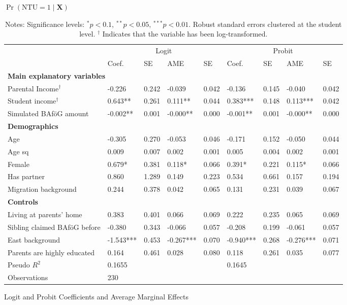 \begin{table}
\caption{$\Pr(\mathrm{NTU} = 1 \mid \mathbf{X})$}
\renewcommand{\arraystretch}{1.25}
\footnotesize
\centering
\begin{tabular}{lllllllll}
\toprule
 & \multicolumn{4}{c}{Logit} & \multicolumn{4}{c}{Probit} \\
\cmidrule(lr){2-5} \cmidrule(lr){6-9}
 & Coef. & SE & AME & SE & Coef. & SE & AME & SE \\
\midrule
\multicolumn{9}{l}{\textbf{Main explanatory variables}} \\
Parental Income$^\dagger$ & -0.226 & 0.242 & -0.039 & 0.042 & -0.136 & 0.145 & -0.040 & 0.042 \\
Student income$^\dagger$ & 0.643** & 0.261 & 0.111** & 0.044 & 0.383*** & 0.148 & 0.113*** & 0.042 \\
Simulated BAföG amount & -0.002** & 0.001 & -0.000** & 0.000 & -0.001** & 0.001 & -0.000** & 0.000 \\
\midrule
\multicolumn{9}{l}{\textbf{Demographics}} \\
Age & -0.305 & 0.270 & -0.053 & 0.046 & -0.171 & 0.152 & -0.050 & 0.044 \\
Age sq & 0.009 & 0.007 & 0.002 & 0.001 & 0.005 & 0.004 & 0.002 & 0.001 \\
Female & 0.679* & 0.381 & 0.118* & 0.066 & 0.391* & 0.221 & 0.115* & 0.066 \\
Has partner & 0.860 & 1.289 & 0.149 & 0.223 & 0.534 & 0.661 & 0.157 & 0.194 \\
Migration background & 0.244 & 0.378 & 0.042 & 0.065 & 0.131 & 0.231 & 0.039 & 0.067 \\
\midrule
\multicolumn{9}{l}{\textbf{Controls}} \\
Living at parents’ home & 0.383 & 0.401 & 0.066 & 0.069 & 0.222 & 0.235 & 0.065 & 0.069 \\
Sibling claimed BAföG before & -0.380 & 0.343 & -0.066 & 0.057 & -0.208 & 0.199 & -0.061 & 0.057 \\
East background & -1.543*** & 0.453 & -0.267*** & 0.070 & -0.940*** & 0.268 & -0.276*** & 0.071 \\
Parents are highly educated & 0.164 & 0.461 & 0.028 & 0.080 & 0.118 & 0.261 & 0.035 & 0.077 \\
\midrule
Pseudo $R^2$ & \multicolumn{4}{l}{0.1655} & \multicolumn{4}{l}{0.1645} \\
Observations & \multicolumn{8}{l}{230} \\
\bottomrule
\end{tabular}
\caption*{Logit and Probit Coefficients and Average Marginal Effects}
\label{tab:logit_probit_results}
\caption*{\small{Notes: Significance levels: $^{{*}} p < 0.1$, $^{{**}} p < 0.05$, $^{{***}} p < 0.01$. Robust standard errors clustered at the student level. $^\dagger$ Indicates that the variable has been log-transformed.}}
\end{table}
